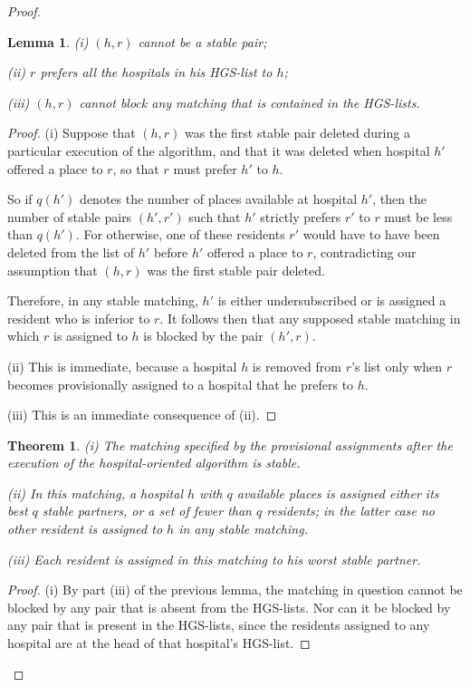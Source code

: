 \documentclass[14pt]{extarticle}
\newtheorem{thm}{Theorem}
\newtheorem{lemma}{Lemma}
\begin{document}
\begin{proof}
\begin{lemma}
(i) $(h,r)$ cannot be a stable pair;

(ii) $r$ prefers all the hospitals in his HGS-list to $h$;

(iii) $(h,r)$ cannot block any matching that is contained in the HGS-lists.
\end{lemma}

\begin{proof}
(i) Suppose that $(h,r)$ was the first stable pair deleted during a
particular execution of the algorithm, and that it was deleted when hospital $h'$ offered a place to $r$, so that $r$ must prefer $h'$ to $h$. 

So if $q(h')$ denotes the number of places available at hospital $h'$, then the number of stable pairs $(h', r')$ such that $h'$ strictly prefers $r'$ to $r$ must be less than $q(h')$. For otherwise, one of these residents $r'$ would have to have been deleted from the list of $h'$ before $h'$ offered a place to $r$, contradicting our assumption that $(h, r)$ was the first stable pair deleted. 

Therefore, in any stable matching, $h'$ is either undersubscribed or is assigned a resident who is inferior to $r$. It follows then that any supposed stable matching in which $r$ is assigned to $h$ is blocked by the pair $(h',r)$.

(ii) This is immediate, because a hospital $h$ is removed from $r$’s list only when $r$ becomes provisionally assigned to a hospital that he prefers to $h$.

(iii) This is an immediate consequence of (ii).
\end{proof}

\begin{thm} (i) The matching specified by the provisional assignments after the execution of the hospital-oriented algorithm is stable.

(ii) In this matching, a hospital $h$ with $q$ available places is assigned either its best $q$ stable partners, or a set of fewer than $q$ residents; in the latter case no other resident is assigned to $h$ in any stable matching.

(iii) Each resident is assigned in this matching to his worst stable partner.
\end{thm}
\begin{proof}

(i) By part (iii) of the previous lemma, the matching in question
cannot be blocked by any pair that is absent from the HGS-lists. Nor can it be blocked by any pair that is present in the HGS-lists, since the residents assigned to any hospital are at the head of that hospital’s HGS-list.


\end{proof}
\end{proof}
\end{document}
